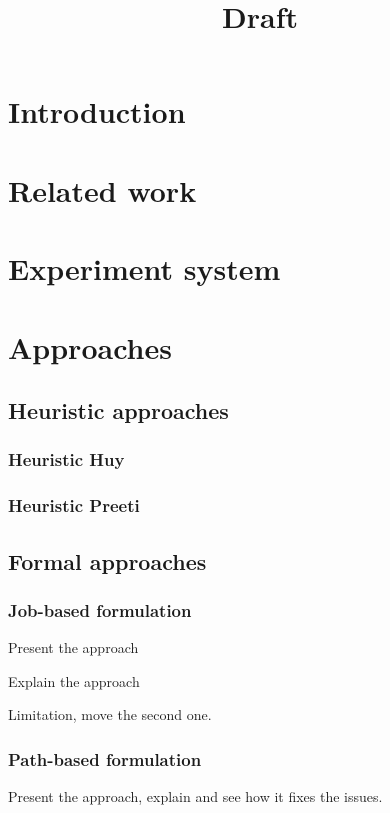 \documentclass[letter]{article}
\title{Draft}
\begin{document}
\maketitle

\section{Introduction}

\section{Related work}

\section{Experiment system}

\section{Approaches}

\subsection{Heuristic approaches}

\subsubsection{Heuristic Huy}

\subsubsection{Heuristic Preeti}

\subsection{Formal approaches}

\subsubsection{Job-based formulation}
Present the approach

Explain the approach

Limitation, move the second one.

\subsubsection{Path-based formulation}
Present the approach, explain and see how it fixes the issues.
\end{document}
